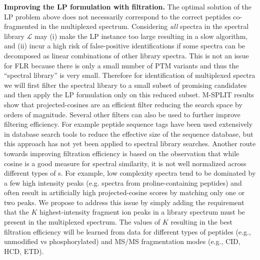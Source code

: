 \documentclass[arial,11pt]{article}
\begin{document}
{\bf Improving the LP formulation with filtration.}
The optimal solution of the LP problem above does not necessarily correspond to the correct peptides co-fragmented in the multiplexed spectrum. Considering {\em all} spectra in the spectral library  $\mathcal{L}$ may (i) make the LP instance too large resulting in a slow algorithm, and (ii) incur a high risk of false-positive identifications if some spectra can be decomposed as linear combinations of other library spectra.
%
This is not an issue for FLR because there is only a small number of PTM variants and thus the ``spectral library'' is very small. Therefore for  identification of multiplexed spectra we will first filter the spectral library to a small subset of promising candidates and then apply the LP formulation only on this reduced subset.  M-SPLIT results show that projected-cosines are an efficient filter  reducing the search space by orders of magnitude. Several other filters can also be used to further improve filtering efficiency. For example peptide sequence tags have been used extensively in database search tools to reduce the effective size of the sequence database, but this approach has not yet been applied to spectral library searches. %
Another route towards improving filtration efficiency is based on the observation that while cosine is a good measure for spectral similarity, it is not well normalized across different types of
s. For example, low complexity spectra tend to be dominated by a few high intensity peaks (e.g. spectra from proline-containing peptides) and often result in artificially high projected-cosine scores by matching only one or two peaks. %
We propose to address this issue by simply adding the requirement that the $K$ highest-intensity fragment ion peaks in a library  spectrum must be present in the multiplexed spectrum. The values of $K$ resulting in the best filtration efficiency will be learned  from data for different types of peptides (e.g., unmodified vs phosphorylated) and MS/MS fragmentation modes (e.g., CID, HCD, ETD).
\end{document}
